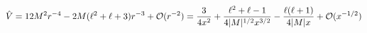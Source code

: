 \begin{equation}\label{zm11}
\hat V = 12 M^2 r^{-4} -2 M (\ell^2+\ell+3) r^{-3} +{\cal{O}}(r^{-2})
= \frac{3}{4 x^2} +\frac{\ell^2+\ell-1}{4|M|^{1/2}x^{3/2}} -\frac{\ell(\ell+1)}{4 |M|x} +{\cal{O}}(x^{-1/2})
\end{equation}
